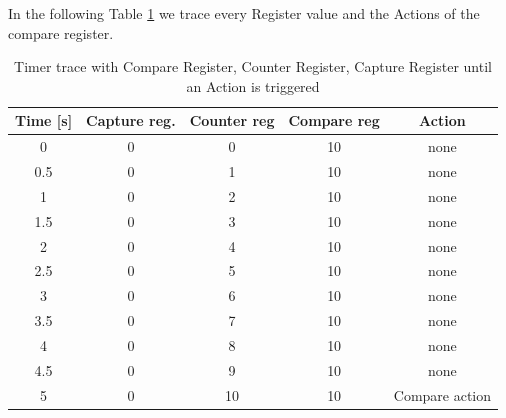 In the following Table \ref{tab:compare_reg} we trace every Register value and the Actions of the compare register.

\begin{table}[h]
	\centering
	\begin{tabular}{| c | c | c | c | c |}
		\hline
		Time [s] & Capture reg. & Counter reg & Compare reg & Action \\
		\hline
		0   & 0 & 0  & 10 & none \\
		0.5 & 0 & 1  & 10 & none \\
		1   & 0 & 2  & 10 & none \\
		1.5 & 0 & 3  & 10 & none \\
		2   & 0 & 4  & 10 & none \\
		2.5 & 0 & 5  & 10 & none \\
		3   & 0 & 6  & 10 & none \\
		3.5 & 0 & 7  & 10 & none \\
		4   & 0 & 8  & 10 & none \\
		4.5 & 0 & 9  & 10 & none \\
		5   & 0 & 10 & 10 & Compare action \\
		\hline
	\end{tabular}
	\caption{Timer trace with Compare Register, Counter Register, Capture Register until an Action is triggered}
	\label{tab:compare_reg}
\end{table}
